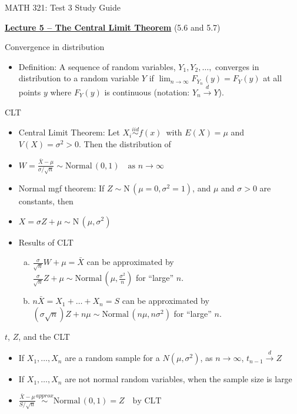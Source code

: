 \documentclass{article}
\newcommand{\bu}[1]{\textbf{\ul{#1}}}				%
\newcommand{\follow}[1]{\sim \text{#1}\,}		%
\newcommand{\followsp}[2]{\overset{#1}\sim \text{#2}\,}		%
\newcommand{\vecn}[2]{#1_1, \ldots, #1_{#2}}	%
\begin{document}
\begin{center}
{\Huge MATH 321: Test 3 Study Guide}

\end{center}

\bigskip\bigskip

{\large \bu{Lecture 5 -- The Central Limit Theorem}} (5.6 and 5.7)\bigskip

Convergence in distribution
\begin{itemize}
    \item Definition: A sequence of random variables, $Y_1, Y_2, \dots,$ converges in distribution to a random variable $Y$ if $\lim_{n \to \infty} F_{Y_n}(y) = F_Y(y)$ at all points $y$ where $F_Y(y)$ is continuous (notation: $Y_n \overset{d}{\to} Y$).
\end{itemize}\bigskip
        
CLT
\begin{itemize}
    \item[] Central Limit Theorem: Let $X_i \followsp{iid}{$f(x)$}$ with $E(X) = \mu$ and $V(X) = \sigma^2 > 0$. Then the distribution of
    \item[] $\displaystyle W = \frac{\bar{X} - \mu}{\sigma / \sqrt{n}} \follow{Normal}(0,1) \quad \text{as } n \to \infty$
    \item Normal mgf theorem: If $Z \follow{N}(\mu = 0, \sigma^2 = 1)$, and $\mu$ and $\sigma > 0$ are constants, then
    \item[] $X = \sigma Z + \mu \follow{N}(\mu, \sigma^2)$
    \item Results of CLT
    \begin{enumerate}[(a)]
        \item $\displaystyle \frac{\sigma}{\sqrt{n}} W + \mu = \bar{X}$ can be approximated by \\ $\displaystyle \frac{\sigma}{\sqrt{n}} Z + \mu \follow{Normal}(\mu, \frac{\sigma^2}{n})$ for ``large'' $n$.
        \item $n \bar{X} = X_1 + \ldots + X_n = S$ can be approximated by \\ $(\sigma \sqrt{n}) Z + n \mu \follow{Normal}(n \mu, n \sigma^2)$ for ``large'' $n$.
    \end{enumerate}        
\end{itemize}\bigskip

$t$, $Z$, and the CLT
\begin{itemize}
    \item If $\vecn{X}{n}$ are a random sample for a $N(\mu, \sigma^2)$, as $n \to \infty$, $t_{n-1} \overset{d} \to Z$
    \item If $\vecn{X}{n}$ are not normal random variables, when the sample size is large
    \item[] $\displaystyle \frac{\bar{X} - \mu}{S / \sqrt{n}} \followsp{approx}{Normal}(0,1) = Z \quad \text{by CLT}$
\end{itemize}\bigskip
\end{document}
